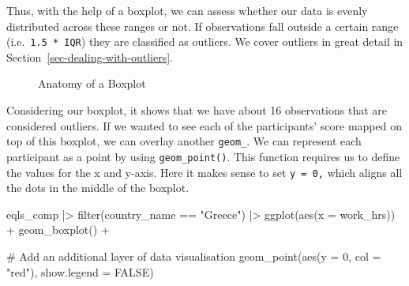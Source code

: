 \documentclass[
  letterpaper,
  DIV=11,
  numbers=noendperiod]{scrreprt}
\newenvironment{Shaded}{\begin{snugshade}}{\end{snugshade}}
\newcommand{\AttributeTok}[1]{\textcolor[rgb]{0.40,0.45,0.13}{#1}}
\newcommand{\CommentTok}[1]{\textcolor[rgb]{0.37,0.37,0.37}{#1}}
\newcommand{\ConstantTok}[1]{\textcolor[rgb]{0.56,0.35,0.01}{#1}}
\newcommand{\DecValTok}[1]{\textcolor[rgb]{0.68,0.00,0.00}{#1}}
\newcommand{\FunctionTok}[1]{\textcolor[rgb]{0.28,0.35,0.67}{#1}}
\newcommand{\NormalTok}[1]{\textcolor[rgb]{0.00,0.23,0.31}{#1}}
\newcommand{\SpecialCharTok}[1]{\textcolor[rgb]{0.37,0.37,0.37}{#1}}
\newcommand{\StringTok}[1]{\textcolor[rgb]{0.13,0.47,0.30}{#1}}
\begin{document}
Thus, with the help of a boxplot, we can assess whether our data is
evenly distributed across these ranges or not. If observations fall
outside a certain range (i.e.~\texttt{1.5\ *\ IQR}) they are classified
as outliers. We cover outliers in great detail in
Section~\ref{sec-dealing-with-outliers}.

\begin{figure}


\caption{\label{fig-anatomy-of-a-boxplot}Anatomy of a Boxplot}

\end{figure}%

Considering our boxplot, it shows that we have about 16 observations
that are considered outliers. If we wanted to see each of the
participants' score mapped on top of this boxplot, we can overlay
another \texttt{geom\_}. We can represent each participant as a point by
using \texttt{geom\_point()}. This function requires us to define the
values for the x and y-axis. Here it makes sense to set
\texttt{y\ =\ 0,} which aligns all the dots in the middle of the
boxplot.

\begin{Shaded}
\begin{Highlighting}[]
\NormalTok{eqls\_comp }\SpecialCharTok{|\textgreater{}}
  \FunctionTok{filter}\NormalTok{(country\_name }\SpecialCharTok{==} \StringTok{"Greece"}\NormalTok{) }\SpecialCharTok{|\textgreater{}}
  \FunctionTok{ggplot}\NormalTok{(}\FunctionTok{aes}\NormalTok{(}\AttributeTok{x =}\NormalTok{  work\_hrs)) }\SpecialCharTok{+}
  \FunctionTok{geom\_boxplot}\NormalTok{() }\SpecialCharTok{+}
  
  \CommentTok{\# Add an additional layer of data visualisation}
  \FunctionTok{geom\_point}\NormalTok{(}\FunctionTok{aes}\NormalTok{(}\AttributeTok{y =} \DecValTok{0}\NormalTok{, }\AttributeTok{col =} \StringTok{"red"}\NormalTok{),}
             \AttributeTok{show.legend =} \ConstantTok{FALSE}\NormalTok{)}
\end{Highlighting}
\end{Shaded}
\end{document}
